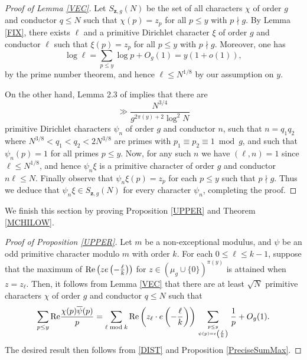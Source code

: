 \documentclass[12pt]{amsart}
\theoremstyle{definition}
\numberwithin{equation}{section}
\newcommand{\mbf}{\mathbf}
\renewcommand{\bar}{\overline}
\begin{document}
\begin{proof}[Proof of Lemma \ref{VEC}]
Let $S_{\mbf{z},g}(N)$ be the set of all characters $\chi$ of order $g$ and conductor $q\leq N$ such that $\chi(p) = z_p$ for all $p\leq y$ with $p\nmid g$. By Lemma \ref{FIX}, there exists $\ell$ and a primitive Dirichlet character $\xi$ of order $g$ and conductor $\ell$ such that $\xi(p) = z_p$ for all $p \leq y$ with $p\nmid g$. Moreover, one has
$$\log \ell =\sum_{p\leq y}\log p+O_g(1)= y(1+o(1)),$$
by the prime number theorem, and hence $\ell\leq N^{1/8}$ by our assumption on $y$. 

On the other hand, Lemma 2.3 of \cite{LAM} implies that there are
$$\gg  \frac{N^{3/4}}{g^{2\pi(y)+2} \log^2 N}$$
primitive Dirichlet characters $\psi_{n}$ of order $g$ and conductor $n$, such that $n=q_1q_2$ where $N^{3/8}<q_1<q_2<2N^{3/8}$ are primes with $p_1\equiv p_2\equiv 1\bmod g$, and such that $\psi_{n}(p)=1$ for all primes $p\leq y$. Now, for any such $n$ we have $(\ell, n)=1$ since $\ell \leq N^{1/8}$, and hence $\psi_{n}\xi$ is a primitive character of order $g$ and conductor $n \ell \leq  N$. Finally observe that $\psi_{n}\xi(p) = z_p$ for each $p \leq y$ such that $p\nmid g$. Thus we deduce that $\psi_{n}\xi\in S_{\mbf{z},g}(N)$ for every character $\psi_{n}$, completing the proof.
 \end{proof}
 We finish this section by proving Proposition \ref{UPPER} and Theorem \ref{MCHILOW}.
 \begin{proof}[Proof of Proposition \ref{UPPER}]
 Let $m$ be a non-exceptional modulus, and $\psi$ be an odd primitive character modulo $m$ with order $k$.  For each $0\leq \ell \leq k-1$, suppose that the maximum of $\textup{Re}\left(ze\left(-\frac{\ell}{k}\right)\right)$ for $z \in (\mu_g \cup \{0\})^{\pi(y)}$ is attained when $z=z_{\ell}$. Then, it follows from Lemma \ref{VEC} that there are at least $\sqrt{N}$ primitive characters $\chi$ of order $g$ and conductor $q\leq N$ such that
$$\sum_{p \leq y} \text{Re}\frac{\chi(p)\bar{\psi}(p)}{p}=\sum_{\ell\bmod k} \text{Re}\left(z_{\ell} \cdot e\left(-\frac{\ell}{k}\right)\right)\sum_{p \leq y \atop \psi(p)= e\left(\frac{\ell}{k}\right)} \frac{1}{p}+O_{g}(1).$$
The desired result then follows from \eqref{DIST} and Proposition \ref{PreciseSumMax}. 
\end{proof}
\end{document}
